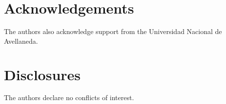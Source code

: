 \documentclass[9pt,twocolumn,twoside]{osajnl}
\begin{document}
\section*{Acknowledgements}
The authors also acknowledge support from the Universidad Nacional de Avellaneda.


\section*{Disclosures}
The authors declare no conflicts of interest.








\end{document}

